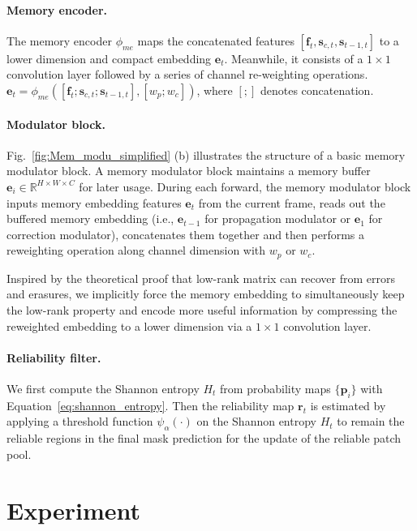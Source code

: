 \documentclass[letterpaper]{article} \usepackage{aaai22}  \usepackage{times}  \usepackage{helvet}  \usepackage{courier}  \usepackage[hyphens]{url}  \usepackage{graphicx} \urlstyle{rm} \def\UrlFont{\rm}  \usepackage{natbib}  \usepackage{caption} \DeclareCaptionStyle{ruled}{labelfont=normalfont,labelsep=colon,strut=off} \frenchspacing  \setlength{\pdfpagewidth}{8.5in}  \setlength{\pdfpageheight}{11in}  \usepackage{algorithm}
\newcommand{\fig}[1]{Fig.~#1}
\newcommand{\eqn}[1]{Equation~#1}
\begin{document}
\paragraph{Memory encoder.}
The memory encoder $\phi_{me}$ maps the concatenated features $[\mathbf{f}_t, \mathbf{s}_{c,t}, \mathbf{s}_{t-1,t}]$ to a lower dimension and compact embedding $\mathbf{e}_t$. Meanwhile, it consists of a $1 \times 1$ convolution layer followed by a series of channel re-weighting operations. $\mathbf{e}_t=\phi_{me}([\mathbf{f}_t;\mathbf{s}_{c,t};\mathbf{s}_{t-1, t}],[w_{p}; w_c])\label{eq:memory_encoder1}$, where $[;]$ denotes concatenation.

\paragraph{Modulator block.}

\fig{\ref{fig:Mem_modu_simplified}} (b) illustrates the structure of a basic memory modulator block.
A memory modulator block maintains a memory buffer $\mathbf{e}_{i} \in\mathbb{R}^{H \times W \times C}$ for later usage. During each forward, the memory modulator block inputs memory embedding features $\mathbf{e}_{t}$ from the current frame, reads out the buffered memory embedding (i.e., $\mathbf{e}_{t-1}$ for propagation modulator or $\mathbf{e}_1$ for correction modulator), concatenates them together and then performs a reweighting operation along channel dimension with $w_{p}$ or $w_c$. 

Inspired by the theoretical proof \cite{chen2011lowrank} that low-rank matrix can recover from errors and erasures, we implicitly force the memory embedding to simultaneously keep the low-rank property and encode more useful information by compressing the reweighted embedding to a lower dimension via a $1 \times 1$ convolution layer. 


\paragraph{Reliability filter.}
We first compute the Shannon entropy $H_t$ from  probability maps $\{\mathbf{p}_{i}\}$ with \eqn{\ref{eq:shannon_entropy}}. Then the reliability map $\mathbf{r}_t$ is estimated by applying a threshold function ${\psi}_{\alpha}(\cdot)$ on the Shannon entropy $H_t$ to remain the reliable regions in the final mask prediction for the update of the reliable patch pool. 


\section{Experiment}\label{sec:Experiment}
\end{document}
